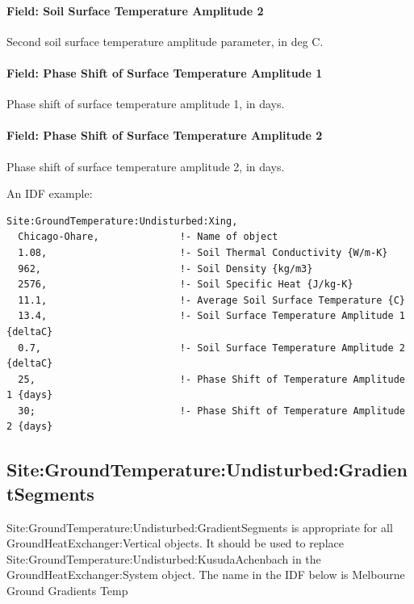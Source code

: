 \paragraph{Field: Soil Surface Temperature Amplitude 2}\label{field-soil-surface-temperature-amplitude-2}

Second soil surface temperature amplitude parameter, in deg C.

\paragraph{Field: Phase Shift of Surface Temperature Amplitude 1}\label{field-phase-shift-of-surface-temperature-amplitude-1}

Phase shift of surface temperature amplitude 1, in days.

\paragraph{Field: Phase Shift of Surface Temperature Amplitude 2}\label{field-phase-shift-of-surface-temperature-amplitude-2}

Phase shift of surface temperature amplitude 2, in days.

An IDF example:

\begin{lstlisting}
Site:GroundTemperature:Undisturbed:Xing,
  Chicago-Ohare,              !- Name of object
  1.08,                       !- Soil Thermal Conductivity {W/m-K}
  962,                        !- Soil Density {kg/m3}
  2576,                       !- Soil Specific Heat {J/kg-K}
  11.1,                       !- Average Soil Surface Temperature {C}
  13.4,                       !- Soil Surface Temperature Amplitude 1 {deltaC}
  0.7,                        !- Soil Surface Temperature Amplitude 2 {deltaC}
  25,                         !- Phase Shift of Temperature Amplitude 1 {days}
  30;                         !- Phase Shift of Temperature Amplitude 2 {days}
\end{lstlisting}


\subsection{Site:GroundTemperature:Undisturbed:GradientSegments}\label{sitegroundtemperatureundisturbedgradientsegments}

Site:GroundTemperature:Undisturbed:GradientSegments is appropriate for all GroundHeatExchanger:Vertical objects. It should be used to replace Site:GroundTemperature:Undisturbed:KusudaAchenbach in the GroundHeatExchanger:System object. The name in the IDF below is Melbourne Ground Gradients Temp

